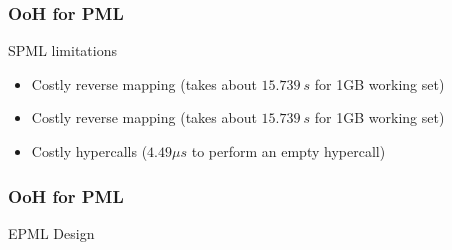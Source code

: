 \documentclass[xcolor=table,bigger,unknownkeysallowed]{beamer}
\begin{document}
        \begin{frame}
			\thispagestyle{empty}
			\frametitle{OoH for PML}
			\begin{block}{SPML limitations}
				\begin{overprint}

				\begin{itemize}
					\item Costly reverse mapping (takes about $15.739 \: s$ for 1GB working set)
					\begin{figure}[!h]
						\label{fig:spml-bottleneck}
					\end{figure}
				\end{itemize}

				\begin{itemize}
					\item Costly reverse mapping (takes about $15.739 \: s$ for 1GB working set)
					\item Costly hypercalls ($4.49 \mu s$ to perform an empty hypercall)
				\end{itemize}

			\end{overprint}

			\end{block} 
        \end{frame}
        \begin{frame}
			\thispagestyle{empty}
			\frametitle{OoH for PML}			
			\begin{block}{EPML Design}
				\begin{figure}
				\centering
				\end{figure}
			\end{block}		
        \end{frame}
\end{document}
